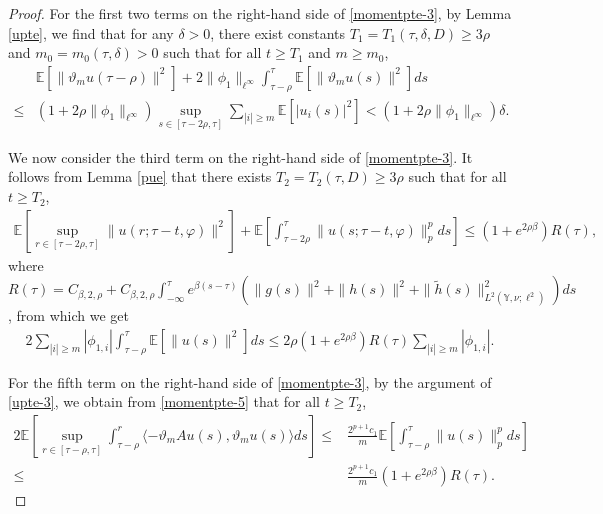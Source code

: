 \documentclass[11pt]{article}
\numberwithin{equation}{section}
\theoremstyle{plain}
\begin{document}
\begin{proof}
 For the first two terms on the right-hand side of \eqref{momentpte-3},
 by Lemma \ref{upte}, we find that for any $\delta > 0$,
 there exist constants $T_1 = T_1(\tau, \delta, D) \ge 3\rho$ and $m_0 = m_0(\tau, \delta) > 0$ such that for all $t \ge T_1$ and $m \ge m_0$,
 \begin{align}\label{momentpte-4}
       & \mathbb{E} \left[ \|\vartheta_m u(\tau-\rho)\|^2 \right]
                 + 2 \|\phi_1\|_{\ell^\infty}
                     \int_{\tau-\rho}^{\tau} \mathbb{E} \left[ \|\vartheta_m u(s)\|^2 \right] ds
                          \nonumber\\
  \le & \left( 1+ 2\rho \|\phi_1\|_{\ell^\infty} \right)
           \sup_{s \in[\tau - 2\rho, \tau]}
                \sum_{|i| \ge m}
                       \mathbb{E} \left[ |u_i(s)|^2 \right]
    < \left( 1+ 2\rho \|\phi_1\|_{\ell^\infty} \right) \delta.
 \end{align}

 We now consider the third term on the right-hand side of \eqref{momentpte-3}.
 It follows from Lemma \ref{pue} that there exists $T_2 = T_2(\tau, D) \ge 3\rho$ such that for all $t \ge T_2$,
 \begin{align}\label{momentpte-5}
    \mathbb{E}
       \left[ \sup_{r \in [\tau-2\rho, \tau]} \|u(r; \tau-t, \varphi)\|^2 \right]
    + \mathbb{E}
         \left[ \int_{\tau-2\rho}^{\tau} \|u(s; \tau-t, \varphi)\|^p_p ds \right]
   \le (1 + e^{2\rho\beta}) R(\tau),
 \end{align}
 where $R(\tau) = C_{\beta,2,\rho} + C_{\beta, 2, \rho} \int_{-\infty}^{\tau}
                               e^{\beta (s-\tau) }
                               \left( \|g(s)\|^2 + \|h(s)\|^2 
                                                        + \|\widetilde{h}(s)\|_{L^2(\mathbb{Y}, \nu; \ell^2)}^2
                               \right) ds$,
from which we get
 \begin{align}\label{momentpte-6}
    2 \sum_{|i| \ge m} |\phi_{1,i}|
         \int_{\tau-\rho}^{\tau} \mathbb{E} \left[ \|u(s)\|^2 \right] ds
    \le 2 \rho (1 + e^{2\rho\beta}) R(\tau) \sum_{|i| \ge m} |\phi_{1,i}|.
 \end{align}

 For the fifth term on the right-hand side of \eqref{momentpte-3},
 by the  argument 
 of  \eqref{upte-3}, 
 we obtain from   \eqref{momentpte-5} 
  that for all $t \ge T_2$,
 \begin{align}\label{momentpte-7}
       2 \mathbb{E}
                 \left[ \sup_{r \in [\tau-\rho,\tau]}
                               \int_{\tau-\rho}^{r}
                                   \langle -\vartheta_m A u(s), \vartheta_m u(s)
                                   \rangle ds
                 \right] 
   \le & \frac{2^{p+1} c_1}{m}
                \mathbb{E} \left[ \int_{\tau-\rho}^{\tau} \|u(s)\|_p^p ds \right]  \nonumber\\
   \le & \frac{2^{p+1} c_1}{m} (1 + e^{2\rho\beta}) R(\tau).
 \end{align}


\end{proof}
\end{document}
